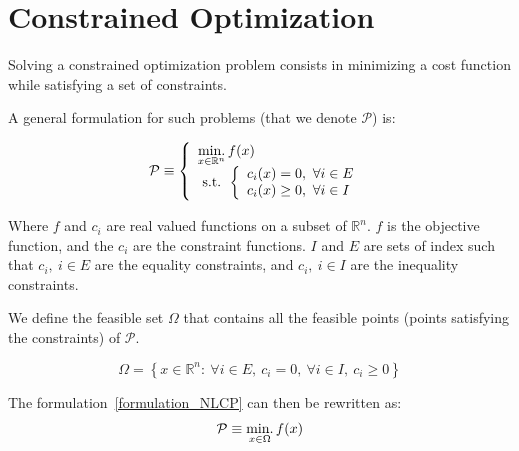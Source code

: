 
\section{Constrained Optimization}

Solving a constrained optimization problem consists in minimizing a cost function while satisfying a set of constraints.

A general formulation for such problems (that we denote $\mathcal{P}$) is:

\begin{equation}
  \label{formulation_NLCP}
  \mathcal{P} \equiv
  \left\{
  \begin{array}{l}
    \operatorname*{min.}\limits_{x\in\mathbb{R}^n}{f(x)}\\
    \text{ s.t. }
    \left\{
    \begin{array}{l}
      c_i(x) = 0,\ \forall i\in{E}\\
      c_i(x) \geq 0,\ \forall i\in{I}\\
    \end{array}
    \right.
  \end{array}
  \right.
\end{equation}

Where $f$ and $c_i$ are real valued functions on a subset of $\mathbb{R}^n$.
$f$ is the objective function, and the $c_i$ are the constraint functions.
${I}$ and ${E}$ are sets of index such that $c_i,\ i\in{E}$ are the equality constraints, and $c_i,\ i\in{I}$ are the inequality constraints.

We define the feasible set $\Omega$ that contains all the feasible points (points satisfying the constraints) of $\mathcal{P}$.

\begin{equation}
  \Omega = \left\{ x\in \mathbb{R}^n:\ \forall i\in {E},\ c_i=0,\ \forall i\in{I},\ c_i \geq0\right\}
\end{equation}

The formulation~\ref{formulation_NLCP} can then be rewritten as:
\begin{equation}
  \label{formulation_NLCP_compact}
  \mathcal{P} \equiv \operatorname*{min.}_{x\in\Omega}{f(x)}
\end{equation}

